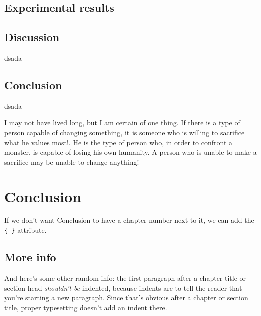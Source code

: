 \documentclass[a4paper, nobind]{templates/cdethesis}
\begin{document}
\label{section:metrics}

\hypertarget{experimental-results}{%
\section{Experimental results}\label{experimental-results}}

\hypertarget{discussion}{%
\section{Discussion}\label{discussion}}

dsada

\hypertarget{conclusion}{%
\section{Conclusion}\label{conclusion}}

dsada

\begin{savequote}
I may not have lived long, but I am certain of one thing. If there is a
type of person capable of changing something, it is someone who is
willing to sacrifice what he values most!. He is the type of person who,
in order to confront a monster, is capable of losing his own humanity. A
person who is unable to make a sacrifice may be unable to change
anything!
\end{savequote}



\hypertarget{conclusion-1}{%
\chapter*{Conclusion}\label{conclusion-1}}

If we don't want Conclusion to have a chapter number next to it, we can add the \texttt{\{-\}} attribute.

\hypertarget{more-info}{%
\section*{More info}\label{more-info}}

And here's some other random info:
the first paragraph after a chapter title or section head \emph{shouldn't be} indented, because indents are to tell the reader that you're starting a new paragraph.
Since that's obvious after a chapter or section title, proper typesetting doesn't add an indent there.
\end{document}
